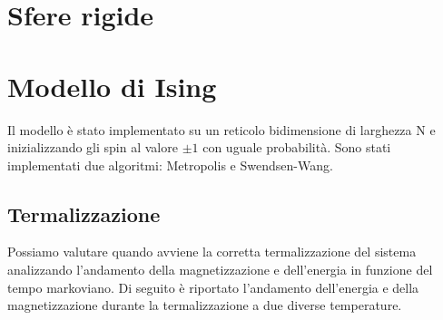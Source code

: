 




\tableofcontents 
\newpage

\chapter{Sfere rigide}






\chapter{Modello di Ising}
Il modello è stato implementato su un reticolo bidimensione di larghezza N e inizializzando gli spin al valore $\pm 1 $  con uguale probabilità.
Sono stati implementati due algoritmi: Metropolis e Swendsen-Wang.\\

\section{Termalizzazione}
Possiamo valutare quando avviene la corretta termalizzazione del sistema analizzando l'andamento della magnetizzazione e dell'energia in funzione del tempo markoviano.
Di seguito è riportato l'andamento dell'energia e della magnetizzazione durante la termalizzazione a due diverse temperature.
